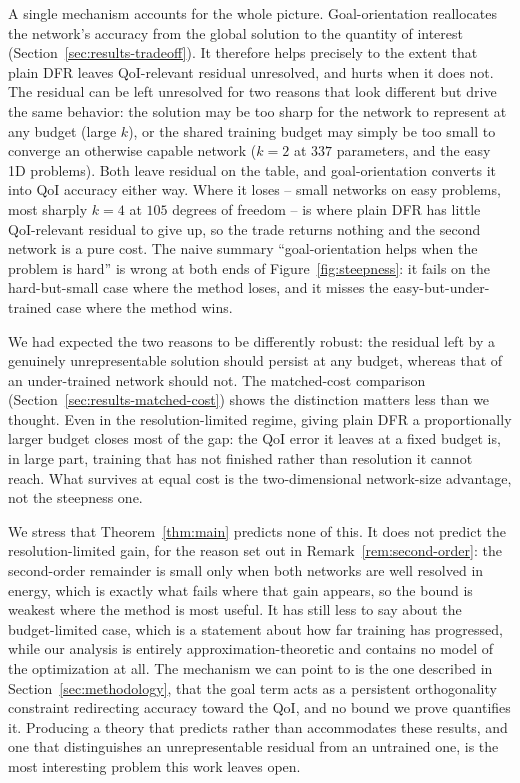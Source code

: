 \documentclass[preprint,11pt]{elsarticle}
\begin{document}
A single mechanism accounts for the whole picture. Goal-orientation reallocates the network's accuracy from the global solution to the quantity of interest (Section~\ref{sec:results-tradeoff}). It therefore helps precisely to the extent that plain DFR leaves QoI-relevant residual unresolved, and hurts when it does not. The residual can be left unresolved for two reasons that look different but drive the same behavior: the solution may be too sharp for the network to represent at any budget (large $k$), or the shared training budget may simply be too small to converge an otherwise capable network ($k = 2$ at $337$ parameters, and the easy 1D problems). Both leave residual on the table, and goal-orientation converts it into QoI accuracy either way. Where it loses -- small networks on easy problems, most sharply $k = 4$ at $105$ degrees of freedom -- is where plain DFR has little QoI-relevant residual to give up, so the trade returns nothing and the second network is a pure cost. The naive summary ``goal-orientation helps when the problem is hard'' is wrong at both ends of Figure~\ref{fig:steepness}: it fails on the hard-but-small case where the method loses, and it misses the easy-but-under-trained case where the method wins.

We had expected the two reasons to be differently robust: the residual left by a genuinely unrepresentable solution should persist at any budget, whereas that of an under-trained network should not. The matched-cost comparison (Section~\ref{sec:results-matched-cost}) shows the distinction matters less than we thought. Even in the resolution-limited regime, giving plain DFR a proportionally larger budget closes most of the gap: the QoI error it leaves at a fixed budget is, in large part, training that has not finished rather than resolution it cannot reach. What survives at equal cost is the two-dimensional network-size advantage, not the steepness one.

We stress that Theorem~\ref{thm:main} predicts none of this. It does not predict the resolution-limited gain, for the reason set out in Remark~\ref{rem:second-order}: the second-order remainder is small only when both networks are well resolved in energy, which is exactly what fails where that gain appears, so the bound is weakest where the method is most useful. It has still less to say about the budget-limited case, which is a statement about how far training has progressed, while our analysis is entirely approximation-theoretic and contains no model of the optimization at all. The mechanism we can point to is the one described in Section~\ref{sec:methodology}, that the goal term acts as a persistent orthogonality constraint redirecting accuracy toward the QoI, and no bound we prove quantifies it. Producing a theory that predicts rather than accommodates these results, and one that distinguishes an unrepresentable residual from an untrained one, is the most interesting problem this work leaves open.
\end{document}
